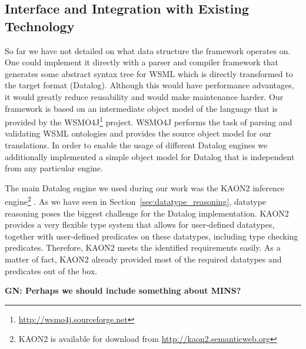 \subsection{Interface and Integration with Existing Technology}
So far we have not detailed on what data structure the framework
operates on. One could implement it directly with a parser and
compiler framework that generates some abstract syntax tree for
WSML which is directly transformed to the target format (Datalog).
Although this would have performance advantages, it would greatly
reduce reusability and would make maintenance harder. Our
framework is based on an intermediate object model of the language
that is provided by the
WSMO4J\footnote{\url{http://wsmo4j.sourceforge.net}} project.
WSMO4J performs the task of parsing and validating WSML ontologies
and provides the source object model for our translations. In
order to enable the usage of different Datalog engines we
additionally implemented a simple object model for Datalog that is
independent from any particular engine.

The main Datalog engine we used during our work was the KAON2
inference engine\footnote{KAON2 is available for download from
\url{http://kaon2.semanticweb.org}} \cite{hustadt04reducing}. As we have seen in Section~\ref{sec:datatype_reasoning}, datatype reasoning poses the biggest challenge for the Datalog implementation.
KAON2 provides a very flexible type system that allows for
user-defined datatypes, together with user-defined predicates on
these datatypes, including type checking predicates. Therefore,
KAON2 meets the identified requirements easily. As a matter of
fact, KAON2 already provided most of the required datatypes and
predicates out of the box.

{\bf GN: Perhaps we should include something about MINS?}
